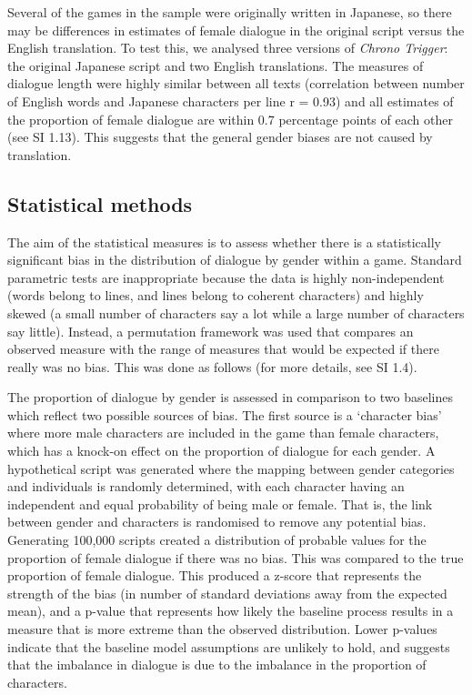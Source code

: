 \documentclass[12pt,a4paper]{article}
\begin{document}
Several of the games in the sample were originally written in Japanese, so there may be differences in estimates of female dialogue in the original script versus the English translation. To test this, we analysed three versions of \emph{Chrono Trigger}: the original Japanese script and two English translations. The measures of dialogue length were highly similar between all texts (correlation between number of English words and Japanese characters per line r = 0.93) and all estimates of the proportion of female dialogue are within 0.7 percentage points of each other (see SI 1.13). This suggests that the general gender biases are not caused by translation.

\subsection*{Statistical methods}

The aim of the statistical measures is to assess whether there is a statistically significant bias in the distribution of dialogue by gender within a game. Standard parametric tests are inappropriate because the data is highly non-independent (words belong to lines, and lines belong to coherent characters) and highly skewed (a small number of characters say a lot while a large number of characters say little). Instead, a permutation framework was used that compares an observed measure with the range of measures that would be expected if there really was no bias. This was done as follows (for more details, see SI 1.4). 

The proportion of dialogue by gender is assessed in comparison to two baselines which reflect two possible sources of bias. The first source is a `character bias' where more male characters are included in the game than female characters, which has a knock-on effect on the proportion of dialogue for each gender. A hypothetical script was generated where the mapping between gender categories and individuals is randomly determined, with each character having an independent and equal probability of being male or female. That is, the link between gender and characters is randomised to remove any potential bias. Generating 100,000 scripts created a distribution of probable values for the proportion of female dialogue if there was no bias. This was compared to the true proportion of female dialogue. This produced a z-score that represents the strength of the bias (in number of standard deviations away from the expected mean), and a p-value that represents how likely the baseline process results in a measure that is more extreme than the observed distribution. Lower p-values indicate that the baseline model assumptions are unlikely to hold, and suggests that the imbalance in dialogue is due to the imbalance in the proportion of characters.
\end{document}
